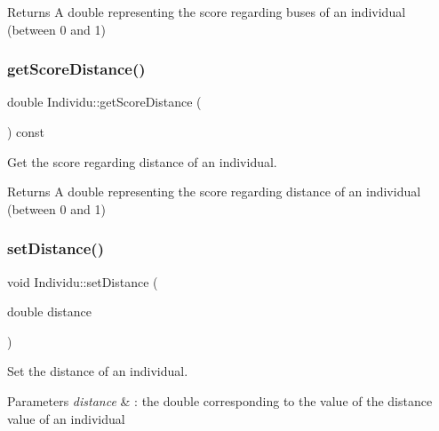\begin{DoxyReturn}{Returns}
A double representing the score regarding buses of an individual (between 0 and 1) 
\end{DoxyReturn}
\mbox{\label{class_individu_a5c6d2ec03c1a493a870ab1340c410e82}} 
\subsubsection{\texorpdfstring{get\+Score\+Distance()}{getScoreDistance()}}
{\footnotesize\ttfamily double Individu\+::get\+Score\+Distance (\begin{DoxyParamCaption}{ }\end{DoxyParamCaption}) const}



Get the score regarding distance of an individual. 

\begin{DoxyReturn}{Returns}
A double representing the score regarding distance of an individual (between 0 and 1) 
\end{DoxyReturn}
\mbox{\label{class_individu_ae7b6566767a9e1b65207eba6c466e033}} 
\subsubsection{\texorpdfstring{set\+Distance()}{setDistance()}}
{\footnotesize\ttfamily void Individu\+::set\+Distance (\begin{DoxyParamCaption}\item[{double}]{distance }\end{DoxyParamCaption})}



Set the distance of an individual. 


\begin{DoxyParams}{Parameters}
{\em distance} & \+: the double corresponding to the value of the distance value of an individual \\
\hline
\end{DoxyParams}
\mbox{\label{class_individu_a1b3a6c4e4387dc538867d0e353601545}} 
